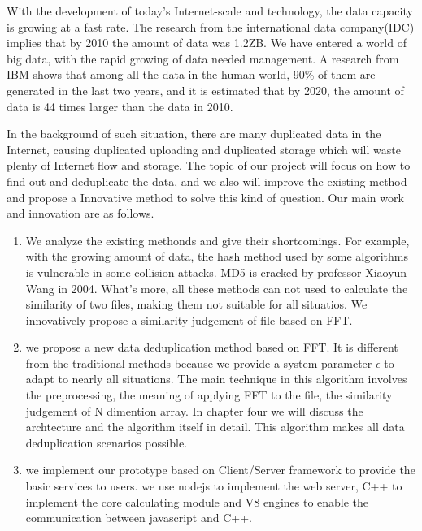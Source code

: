 \begin{englishabstract}

    With the development of today's Internet-scale and technology, the data capacity is growing at a fast rate. The research from the international data company(IDC) implies that by 2010 the amount of data was 1.2ZB. We have entered a world of big data, with the rapid growing of data needed management. A research from IBM shows that among all the data in the human world, 90\% of them are generated in the last two years, and it is estimated that by 2020, the amount of data is 44 times larger than the data in 2010.

    In the background of such situation, there are many duplicated data in the Internet, causing duplicated uploading and duplicated storage which will waste plenty of Internet flow and storage. The topic of our project will focus on how to find out and deduplicate the data, and we also will improve the existing method and propose a Innovative method to solve this kind of question. Our main work and innovation are as follows.

\begin{enumerate}
    \item We analyze the existing methonds and give their shortcomings. For example, with the growing amount of data, the hash method used by some algorithms is vulnerable in some collision attacks. MD5 is cracked by professor Xiaoyun Wang in 2004. What's more, all these methods can not used to calculate the similarity of two files, making them not suitable for all situatios. We innovatively propose a similarity judgement of file based on FFT.

    \item we propose a new data deduplication method based on FFT. It is different from the traditional methods because we provide a system parameter $\epsilon$ to adapt to nearly all situations. The main technique in this algorithm involves the preprocessing, the meaning of applying FFT to the file, the similarity judgement of N dimention array. In chapter four we will discuss the archtecture and the algorithm itself in detail. This algorithm makes all data deduplication scenarios possible.

    \item we implement our prototype based on Client/Server framework to provide the basic services to users. we use nodejs to implement the web server, C++ to implement the core calculating module and V8 engines to enable the communication between javascript and C++.
\end{enumerate}

\end{englishabstract}
